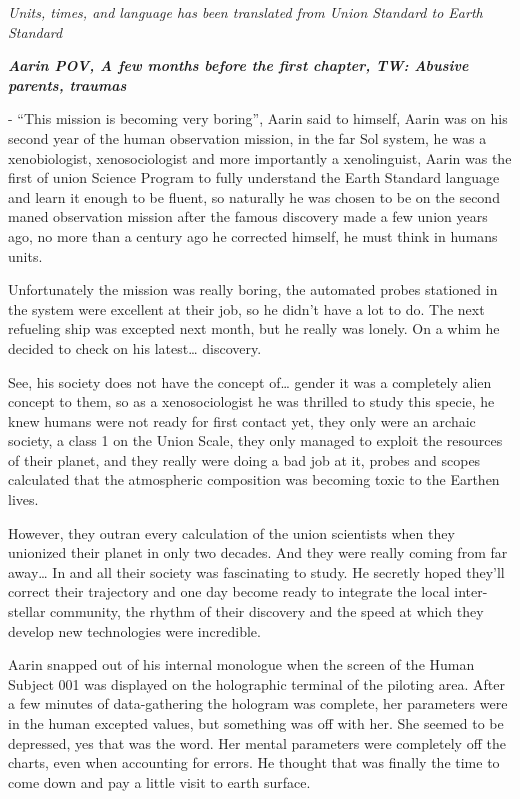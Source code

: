 \documentclass[colorlinks,12pt,a4paper]{book}
\begin{document}
\textit{Units, times, and language has been translated from Union Standard to Earth Standard}\par
\textit{\textbf{Aarin POV, A few months before the first chapter, TW: Abusive parents, traumas}} \par
\bigskip
- “This mission is becoming very boring”, Aarin said to himself,
Aarin was on his second year of the human observation mission, in the far Sol system, 
he was a xenobiologist, xenosociologist and more importantly a xenolinguist, 
Aarin was the first of \gls{union} Science Program to fully understand the Earth Standard language and 
learn it enough to be fluent, so naturally he was chosen to be on the second maned observation mission after the 
famous discovery made a few union years ago, no more than a century ago he corrected himself, he must think in humans units.\par
\bigskip

Unfortunately the mission was really boring, the automated probes stationed in the system were 
excellent at their job, so he didn't have a lot to do. The next refueling ship was excepted next 
month, but he really was lonely. On a whim he decided to check on his latest… discovery.\par
\bigskip

See, his society does not have the concept of… gender it was a completely alien concept to them, so as a 
xenosociologist he was thrilled to study this specie, he knew humans were not ready for first contact yet, 
they only were an archaic society, a class 1 on the Union Scale, they only managed to exploit the resources of their 
planet, and they really were doing a bad job at it, probes and scopes calculated that the atmospheric composition was 
becoming toxic to the Earthen lives.\par
\bigskip

However, they outran every calculation of the union scientists when they unionized their planet in only two decades. 
And they were really coming from far away… In and all their society was fascinating to study. 
He secretly hoped they'll correct their trajectory and one day become ready to integrate the local inter-stellar community, 
the rhythm of their discovery and the speed at which they develop new technologies were incredible.\par
\bigskip

Aarin snapped out of his internal monologue when the screen of the Human Subject 001 was displayed on the holographic terminal of the piloting area.
After a few minutes of data-gathering the hologram was complete, her parameters were in the human excepted values, 
but something was off with her. She seemed to be depressed, yes that was the word. Her mental parameters were completely 
off the charts, even when accounting for errors. He thought that was finally the time to come down and pay a little visit 
to earth surface.\par
\bigskip
\end{document}
